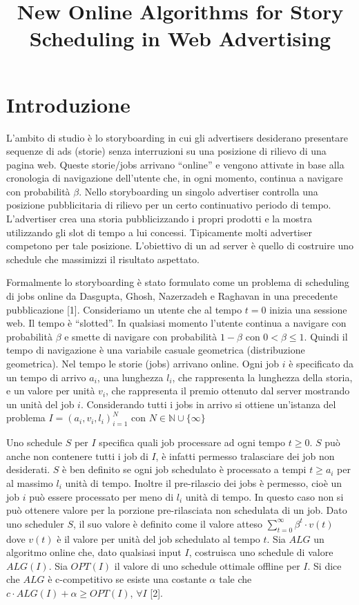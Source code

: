 \documentclass[12pt]{article}
\title{ \LARGE\textbf{New Online Algorithms for Story Scheduling in Web Advertising}}
\date{}
\newcommand*{\N}{\mathbb{N}}
\begin{document}
\maketitle
\section{Introduzione}
L’ambito di studio è lo storyboarding in cui gli advertisers desiderano presentare sequenze di ads (storie) senza interruzioni su una posizione di rilievo di una pagina web. Queste storie/jobs arrivano “online” e vengono attivate in base alla cronologia di navigazione dell'utente che, in ogni momento, continua a navigare con probabilità $\beta$. Nello storyboarding un singolo advertiser controlla una posizione pubblicitaria di rilievo per un certo continuativo periodo di tempo. L’advertiser crea una storia pubblicizzando i propri prodotti e la mostra utilizzando gli slot di tempo a lui concessi. Tipicamente molti advertiser competono per tale posizione. L’obiettivo di un ad server è quello di costruire uno schedule che massimizzi il risultato aspettato.

Formalmente lo storyboarding è stato formulato come un problema di scheduling di jobs online da Dasgupta, Ghosh, Nazerzadeh e Raghavan in una precedente pubblicazione [1]. Consideriamo un utente che al tempo $t = 0$ inizia una sessione web. Il tempo è “slotted”. In qualsiasi momento l’utente continua a navigare con probabilità $\beta$ e smette di navigare con probabilità $1 - \beta$ con $0 < \beta \leq 1$. Quindi il tempo di navigazione è una variabile casuale geometrica (distribuzione geometrica). Nel tempo le storie (jobs) arrivano online. Ogni job $i$ è specificato da un tempo di arrivo $a_{i}$, una lunghezza $l_{i}$, che rappresenta la lunghezza della storia, e un valore per unità $v_{i}$, che rappresenta il premio ottenuto dal server mostrando un unità del job $i$. Considerando tutti i jobs in arrivo si ottiene un'istanza del problema $I = (a_{i}, v_{i}, l_{i})_{i=1}^{N}$ con  $N \in \N \cup \{ \infty \}$

Uno schedule $S$ per $I$ specifica quali job processare ad ogni tempo $t \geq 0$. $S$ può anche non contenere tutti i job di $I$, è infatti permesso tralasciare dei job non desiderati. $S$ è ben definito se ogni job schedulato è processato a tempi $t \geq a_{i}$ per al massimo $l_{i}$ unità di tempo. Inoltre il pre-rilascio dei jobs è permesso, cioè un job $i$ può essere processato per meno di $l_{i}$ unità di tempo. In questo caso non si può ottenere valore per la porzione pre-rilasciata non schedulata di un job. 
Dato uno scheduler $S$, il suo valore è definito come il valore atteso $\sum_{t=0}^{\infty} \beta^{t}\cdot v(t)$ dove $v(t)$ è il valore per unità del job schedulato al tempo $t$. Sia $ALG$ un algoritmo online che, dato qualsiasi input $I$, costruisca uno schedule di valore $ALG(I)$. Sia $OPT(I)$ il valore di uno schedule ottimale offline per $I$. Si dice che $ALG$ è c-competitivo se esiste una costante $\alpha$ tale che $c \cdot ALG(I) + \alpha \geq OPT(I)$, $\forall I$ [2].
\end{document}
